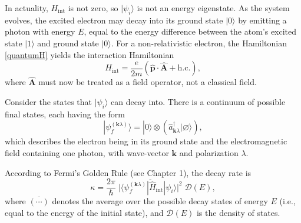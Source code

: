 \documentclass[pra,12pt]{revtex4}
\begin{document}
In actuality, $H_{\mathrm{int}}$ is not zero, so $|\psi_i\rangle$ is
not an energy eigenstate.  As the system evolves, the excited electron
may decay into its ground state $|0\rangle$ by emitting a photon with
energy $E$, equal to the energy difference between the atom's excited
state $|1\rangle$ and ground state $|0\rangle$.  For a
non-relativistic electron, the Hamiltonian \eqref{quantumH} yields the
interaction Hamiltonian
\begin{equation}
  H_{\mathrm{int}} = \frac{e}{2m} \left( \hat{\mathbf{p}} \cdot \hat{\mathbf{A}} + \mathrm{h.c.}\right),
\end{equation}
where $\hat{\mathbf{A}}$ must now be treated as a field operator, not
a classical field.

Consider the states that $|\psi_i\rangle$ can decay into.  There is a
continuum of possible final states, each having the form
\begin{equation}
  | \psi_{f}^{(\mathbf{k}\lambda)} \rangle = |0\rangle \otimes
  \left( \hat{a}_{\mathbf{k}\lambda}^\dagger |\varnothing\rangle\right),
  \label{decaystate}
\end{equation}
which describes the electron being in its ground state and the
electromagnetic field containing one photon, with wave-vector
$\mathbf{k}$ and polarization $\lambda$.

According to Fermi's Golden Rule (see Chapter 1), the decay rate is
\begin{equation}
  \kappa = \frac{2\pi}{\hbar} \;
  \overline{\Big| \langle \psi_{f}^{(\mathbf{k}\lambda)} | \hat{H}_{\mathrm{int}}|\psi_i\rangle\Big|^2} \;
  \mathcal{D}(E),
\end{equation}
where $\overline{(\cdots)}$ denotes the average over the possible
decay states of energy $E$ (i.e., equal to the energy of the initial
state), and $\mathcal{D}(E)$ is the density of states.
\end{document}
